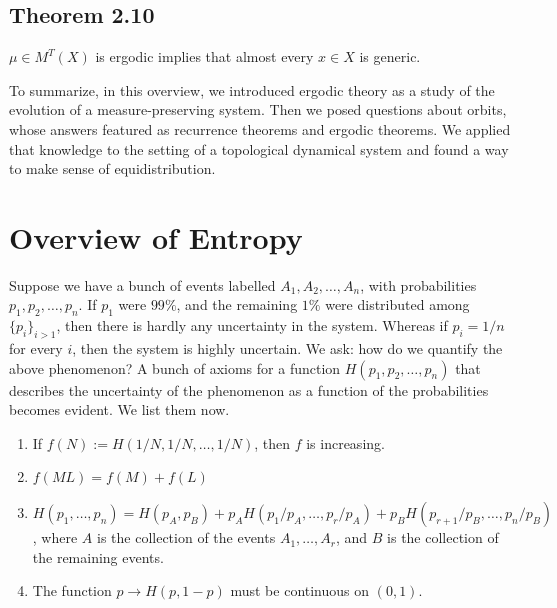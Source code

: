 \documentclass[11pt,a4paper]{article}
\begin{document}
\subsection*{Theorem 2.10}
    $\mu\in M^T(X)$ is ergodic implies that almost every $x\in X$ is generic.


To summarize, in this overview, we introduced ergodic theory as a study of the
evolution of a measure-preserving system. Then we posed questions about
orbits, whose answers featured as recurrence theorems and ergodic theorems.
We applied that knowledge to the setting of a topological dynamical system and
found a way to make sense of equidistribution.

\section{Overview of Entropy}
Suppose we have a bunch of events labelled $A_1,A_2,\ldots,A_n$, with
probabilities $p_1,p_2,\ldots,p_n$. If $p_1$ were $99\%$, and the remaining
$1\%$ were distributed among $\{p_i\}_{i>1}$, then there is hardly any
uncertainty in the system. Whereas if $p_i=1/n$ for every $i$, then the system
is highly uncertain. We ask: how do we quantify the above phenomenon? A bunch
of axioms for a function $H(p_1,p_2,\ldots,p_n)$ that describes the
uncertainty of the phenomenon as a function of the probabilities becomes
evident. We list them now.

\begin{enumerate}
    \item If $f(N):= H(1/N, 1/N, \ldots, 1/N)$, then $f$ is increasing.
    \item $f(ML) = f(M) + f(L)$
    \item $H(p_1, \ldots, p_n) = H(p_A, p_B) + p_AH(p_1/p_A, \ldots, p_r/p_A) + p_BH(p_{r+1}/p_B, \ldots, p_n/p_B)$, where $A$ is the collection of the events $A_1, \ldots, A_r$, and $B$ is the collection of the remaining events.
    \item The function $p\rightarrow H(p, 1-p)$ must be continuous on $(0,1)$.
\end{enumerate}
\end{document}
